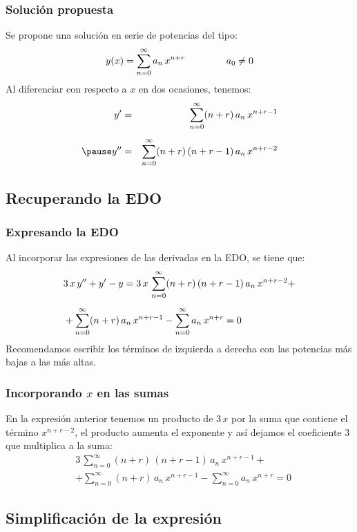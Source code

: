 \documentclass[12pt]{beamer}
\begin{document}
\begin{frame}
\frametitle{Solución propuesta}
Se propone una solución en serie de potencias del tipo:
\begin{align*}
y(x) = \sum_{n=0}^{\infty} a_{n} \, x^{n+r} \hspace{1.5cm} a_{0} \neq 0
\end{align*}
\pause
Al diferenciar con respecto a $x$ en dos ocasiones, tenemos:
\begin{eqnarray*}
\ptilde{y} &=& \sum_{n=0}^{\infty} (n + r) \, a_{n} \, x^{n+r-1} \\[0.5em] \pause
\stilde{y} &=& \sum_{n=0}^{\infty} (n + r) \, (n + r - 1) \, a_{n} \, x^{n+r-2}
\end{eqnarray*}
\end{frame}

\subsection*{Recuperando la EDO}

\begin{frame}
\frametitle{Expresando la EDO}
Al incorporar las expresiones de las derivadas en la EDO, se tiene que:
\pause
\begin{align*}
&3 \, x \, {y}^{\prime \prime} + {y}^{\prime} - y = 3 \, x \, \sum_{n=0}^{\infty} (n + r) \, (n + r - 1) \, a_{n} \, x^{n+r-2} + \\[0.5em]
&+ \sum_{n=0}^{\infty} (n + r) \, a_{n} \, x^{n+r-1} - \sum_{n=0}^{\infty} a_{n} \, x^{n+r} = 0
\end{align*}
\pause
Recomendamos escribir los términos de izquierda a derecha con las potencias más bajas a las más altas.
\end{frame}
\begin{frame}
\frametitle{Incorporando $x$ en las sumas}
En la expresión anterior tenemos un producto de $3 \, x$ por la suma que contiene el término $x^{n+r-2}$, el producto aumenta el exponente y así dejamos el coeficiente $3$ que multiplica a la suma:
\pause
\begin{align*}
&3 \, \sum_{n=0}^{\infty} (n + r) \, (n + r - 1) \, a_{n} \, x^{n+r-1} + \\[0.5em]
&+ \sum_{n=0}^{\infty} (n + r) \, a_{n} \, x^{n+r-1} - \sum_{n=0}^{\infty} a_{n} \, x^{n+r} = 0
\end{align*}    
\end{frame}

\subsection*{Simplificación de la expresión}
\end{document}
